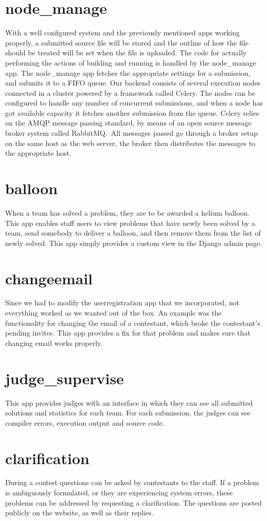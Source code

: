 \section{node\_manage}
With a well configured system and the previously mentioned apps working
properly, a submitted source file will be stored and the outline of how
the file should be treated will be set when the file is uploaded. The
code for actually performing the actions of building and running is
handled by the node\_manage app. The node\_manage app fetches the
appropriate settings for a submission, and submits it to a FIFO queue.
Our backend consists of several execution nodes connected in a cluster
powered by a framework called Celery. The nodes can be configured to
handle any number of concurrent submissions, and when a node has got
available capacity it fetches another submission from the queue. Celery
relies on the AMQP message passing standard, by means of an open source
message broker system called RabbitMQ.\ All messages passed go through a
broker setup on the same host as the web server, the broker then
distributes the messages to the appropriate host. 

\section{balloon}
When a team has solved a problem, they are to be awarded a helium
balloon. This app enables staff users to view problems that have newly
been solved by a team, send somebody to deliver a balloon, and then
remove them from the list of newly solved. This app simply provides
a custom view in the Django admin page.

\section{changeemail}
Since we had to modify the userregistration app that we incorporated,
not everything worked as we wanted out of the box. An example was
the functionality for changing the email of a contestant, which broke 
the contestant's pending invites. This app provides a fix for that
problem and makes sure that changing email works properly.

\section{judge\_supervise}
This app provides judges with an interface in which they can see all
submitted solutions and statistics for each team. For each submission,
the judges can see compiler errors, execution output and source code. 

\section{clarification}
During a contest questions can be asked by contestants to the staff. If
a problem is ambiguously formulated, or they are experiencing system
errors, these problems can be addressed by requesting a clarification.
The questions are posted publicly on the website, as well as their replies.

